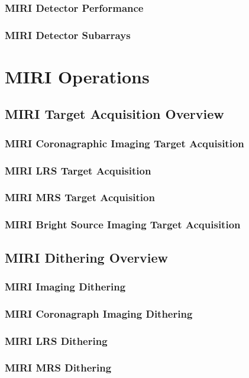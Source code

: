          \subsubsection{MIRI Detector Performance}
         \subsubsection{MIRI Detector Subarrays}


\section{MIRI Operations}
\subsection{MIRI Target Acquisition Overview}
\subsubsection{MIRI Coronagraphic Imaging Target Acquisition}
\subsubsection{MIRI LRS Target Acquisition}
\subsubsection{MIRI MRS Target Acquisition}
\subsubsection{MIRI Bright Source Imaging Target Acquisition}

\subsection{MIRI Dithering Overview}
\subsubsection{MIRI Imaging Dithering}
\subsubsection{MIRI Coronagraph Imaging Dithering}
\subsubsection{MIRI LRS Dithering}
\subsubsection{MIRI MRS Dithering}
